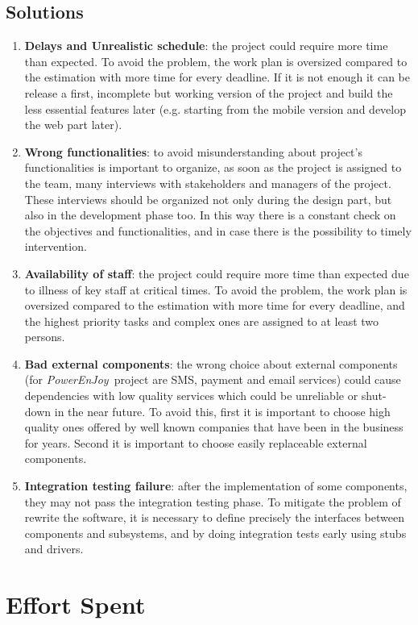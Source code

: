 \documentclass{article}
\newcommand{\pej}{\mbox{\normalfont\itshape PowerEnJoy }}
\begin{document}
		\subsection{Solutions}
		\begin{enumerate}
			\item \textbf{Delays and Unrealistic schedule}: the project could require more time than expected. To avoid the problem, the work plan is oversized compared to the estimation with more time for every deadline. If it is not enough it can be release a first, incomplete but working version of the project and build the less essential features later (e.g. starting from the mobile version and develop the web part later).
			\item \textbf{Wrong functionalities}: to avoid misunderstanding about project's functionalities is important to organize, as soon as the project is assigned to the team, many interviews with stakeholders and managers of the project. These interviews should be organized not only during the design part, but also in the development phase too. In this way there is a constant check on the objectives and functionalities, and in case there is the possibility to timely intervention.
			\item \textbf{Availability of staff}: the project could require more time than expected due to illness of key staff at critical times. To avoid the problem, the work plan is oversized compared to the estimation with more time for every deadline, and the highest priority tasks and complex ones are assigned to at least two persons.
			\item \textbf{Bad external components}: the wrong choice about external components (for \pej project are SMS, payment and email services) could cause dependencies with low quality services which could be unreliable or shut-down in the near future. To avoid this, first it is important to choose high quality ones offered by well known companies that have been in the business for years. Second it is important to choose easily replaceable external components.
			\item \textbf{Integration testing failure}: after the implementation of some components, they may not pass the integration testing phase. To mitigate the problem of rewrite the software, it is necessary to define precisely the interfaces between components and subsystems, and by doing integration tests early using stubs and drivers.
		\end{enumerate}
	\pagebreak
	
	\section{Effort Spent}
\end{document}
